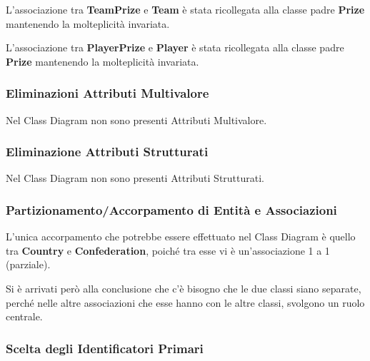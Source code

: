 L'associazione tra \textbf{TeamPrize} e 
\textbf{Team} è stata ricollegata alla classe padre 
\textbf{Prize} mantenendo la molteplicità invariata.

L'associazione tra \textbf{PlayerPrize} e 
\textbf{Player} è stata ricollegata alla classe 
padre \textbf{Prize} mantenendo la molteplicità invariata.

\newpage
\subsubsection{Eliminazioni Attributi Multivalore}
\bigskip

Nel Class Diagram non sono presenti Attributi Multivalore.

\bigskip
\subsubsection{Eliminazione Attributi Strutturati}
\bigskip

Nel Class Diagram non sono presenti Attributi Strutturati.

\bigskip
\subsubsection{Partizionamento/Accorpamento di Entità
		e Associazioni}
\bigskip

L'unica accorpamento che potrebbe essere effettuato nel Class 
Diagram è quello tra \textbf{Country} e 
\textbf{Confederation}, poiché tra esse vi è un'associazione 
1 a 1 (parziale).

Si è arrivati però alla conclusione che c'è bisogno che le 
due classi siano separate, perché nelle altre associazioni 
che esse hanno con le altre classi, svolgono un ruolo 
centrale.

\newpage
\bigskip
\subsubsection{Scelta degli Identificatori Primari}
\bigskip

\newpage
